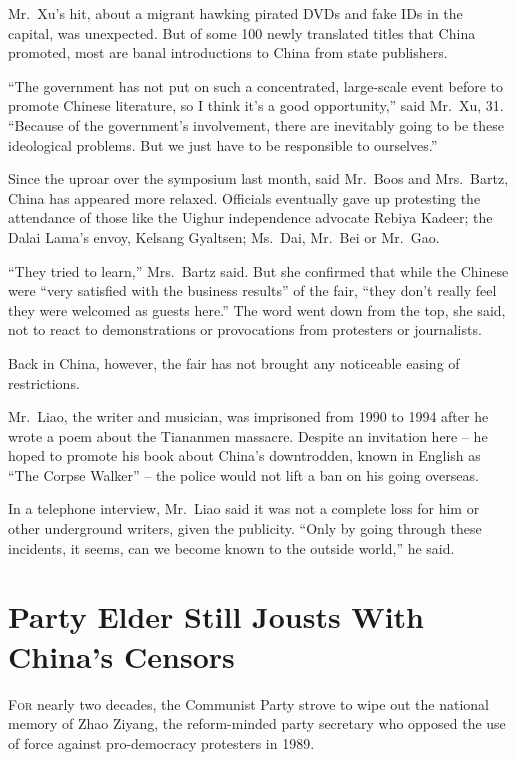 ﻿\documentclass[12pt]{article}
\begin{document}
Mr.~Xu's hit, about a migrant hawking pirated DVDs and fake IDs in the capital, was unexpected. But
of some 100 newly translated titles that China promoted, most are banal introductions to China from
state publishers.

``The government has not put on such a concentrated, large-scale event before to promote Chinese
literature, so I think it's a good opportunity,'' said Mr.~Xu, 31. ``Because of the government's
involvement, there are inevitably going to be these ideological problems. But we just have to be
responsible to ourselves.''

Since the uproar over the symposium last month, said Mr.~Boos and Mrs.~Bartz, China has appeared
more relaxed. Officials eventually gave up protesting the attendance of those like the Uighur
independence advocate Rebiya Kadeer; the Dalai Lama's envoy, Kelsang Gyaltsen; Ms.~Dai, Mr.~Bei or
Mr.~Gao.

``They tried to learn,'' Mrs.~Bartz said. But she confirmed that while the Chinese were ``very
satisfied with the business results'' of the fair, ``they don't really feel they were welcomed as
guests here.'' The word went down from the top, she said, not to react to demonstrations or
provocations from protesters or journalists.

Back in China, however, the fair has not brought any noticeable easing of restrictions.

Mr.~Liao, the writer and musician, was imprisoned from 1990 to 1994 after he wrote a poem about the
Tiananmen massacre. Despite an invitation here -- he hoped to promote his book about China's
downtrodden, known in English as ``The Corpse Walker'' -- the police would not lift a ban on his
going overseas.

In a telephone interview, Mr.~Liao said it was not a complete loss for him or other underground
writers, given the publicity. ``Only by going through these incidents, it seems, can we become known
to the outside world,'' he said.

\section{Party Elder Still Jousts\cite{joust} With China's Censors}

\lettrine{F}{or} nearly two decades, the Communist Party strove to wipe out
the national memory of Zhao Ziyang, the reform-minded party secretary who opposed the use of force
against pro-democracy protesters in 1989.
\end{document}
